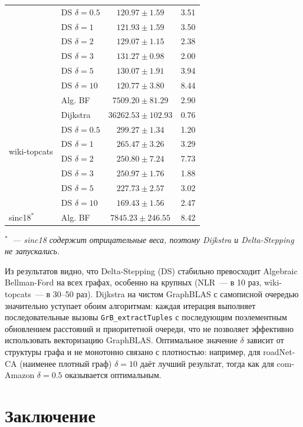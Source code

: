 \documentclass[a4paper]{article}
\begin{document}
\begin{table}[h!]
\begin{minipage}{0.48\textwidth}
\begin{tabular}{llcc}
    & DS $\delta=0.5$ & $120.97 \pm 1.59$ & 3.51 \\
    & DS $\delta=1$ & $121.93 \pm 1.59$ & 3.50 \\
    & DS $\delta=2$ & $129.07 \pm 1.15$ & 2.38 \\
    & DS $\delta=3$ & $131.27 \pm 0.98$ & 2.00 \\
    & DS $\delta=5$ & $130.07 \pm 1.91$ & 3.94 \\
    & DS $\delta=10$ & $120.77 \pm 3.80$ & 8.44 \\
\midrule
\multirow{8}{*}{wiki-topcats}
    & Alg. BF & $7509.20 \pm 81.29$ & 2.90 \\
    & Dijkstra & $36262.53 \pm 102.93$ & 0.76 \\
    & DS $\delta=0.5$ & $299.27 \pm 1.34$ & 1.20 \\
    & DS $\delta=1$ & $265.47 \pm 3.26$ & 3.29 \\
    & DS $\delta=2$ & $250.80 \pm 7.24$ & 7.73 \\
    & DS $\delta=3$ & $250.97 \pm 1.76$ & 1.88 \\
    & DS $\delta=5$ & $227.73 \pm 2.57$ & 3.02 \\
    & DS $\delta=10$ & $169.43 \pm 1.56$ & 2.47 \\
\midrule
\multirow{1}{*}{sinc18$^*$}
    & Alg. BF & $7845.23 \pm 246.55$ & 8.42 \\
\bottomrule
\end{tabular}
\smallskip

\noindent\emph{$^*$~--- sinc18 содержит отрицательные веса, поэтому Dijkstra и Delta-Stepping не запускались.}
\end{minipage}
\end{table}

Из результатов видно, что Delta-Stepping (DS) стабильно превосходит Algebraic Bellman-Ford
на всех графах, особенно на крупных (NLR~--- в 10 раз, wiki-topcats~--- в 30--50 раз).
Dijkstra на чистом GraphBLAS с самописной очередью значительно уступает обоим
алгоритмам: каждая итерация выполняет последовательные вызовы
\texttt{GrB\_extractTuples} с последующим поэлементным обновлением расстояний
и приоритетной очереди, что не позволяет эффективно использовать векторизацию
GraphBLAS.
Оптимальное значение $\delta$ зависит от
структуры графа и не монотонно связано с плотностью: например, для roadNet-CA
(наименее плотный граф) $\delta = 10$ даёт лучший результат, тогда как для
com-Amazon $\delta = 0.5$ оказывается оптимальным.

\section{Заключение}
\end{document}
